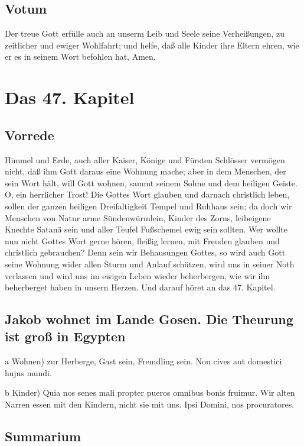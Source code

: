 \section{Votum}

Der treue Gott erfülle auch an unserm Leib und Seele seine Verheißungen, zu zeitlicher und ewiger Wohlfahrt; und helfe, daß alle Kinder ihre Eltern ehren, wie er es in seinem Wort befohlen hat, Amen.

\chapter{Das 47. Kapitel}

\section{Vorrede}

Himmel und Erde, auch aller Kaiser, Könige und Fürsten Schlösser vermögen nicht, daß ihm Gott daraus eine Wohnung mache; aber in dem Menschen, der sein Wort hält, will Gott wohnen, sammt seinem Sohne und dem heiligen Geiste. O, ein herrlicher Trost! Die Gottes Wort glauben und darnach christlich leben, sollen der ganzen heiligen Dreifaltigkeit Tempel und Ruhhaus sein; da doch wir Menschen von Natur arme Sündenwürmlein, Kinder des Zorns, leibeigene Knechte Satanä sein und aller Teufel Fußschemel ewig sein sollten. Wer wollte nun nicht Gottes Wort gerne hören, fleißig lernen, mit Freuden glauben und christlich gebrauchen? Denn sein wir Behausungen Gottes, so wird auch Gott seine Wohnung wider allen Sturm und Anlauf schützen, wird uns in seiner Noth verlassen und wird uns im ewigen Leben wieder beherbergen, wie wir ihn beherberget haben in unsern Herzen. Und darauf höret an das 47. Kapitel.

\section[Jakob wohnet im Lande Gosen. Die Theurung ist]{Jakob wohnet im Lande Gosen. Die Theurung ist groß in Egypten}

a Wohnen) zur Herberge, Gast sein, Fremdling sein. Non cives aut domestici hujus mundi.

b Kinder) Quia nos senes mali propter pueros omnibus bonis fruimur. Wir alten Narren essen mit den Kindern, nicht sie mit uns. Ipsi Domini, nos procuratores.

\section{Summarium}

